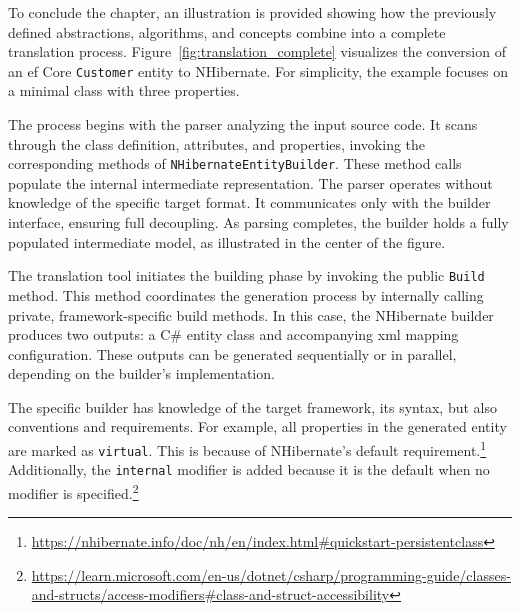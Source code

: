 \begin{example}
\small
To conclude the chapter, an illustration is provided showing how the previously defined abstractions, algorithms, and concepts combine into a complete translation process. Figure~\ref{fig:translation_complete} visualizes the conversion of an \acrshort{ef} Core \texttt{Customer} entity to NHibernate. For simplicity, the example focuses on a minimal class with three properties.

The process begins with the parser analyzing the input source code. It scans through the class definition, attributes, and properties, invoking the corresponding methods of \texttt{NHibernateEntityBuilder}. These method calls populate the internal intermediate representation. The parser operates without knowledge of the specific target format. It communicates only with the builder interface, ensuring full decoupling. As parsing completes, the builder holds a fully populated intermediate model, as illustrated in the center of the figure. 

The translation tool initiates the building phase by invoking the public \texttt{Build} method. This method coordinates the generation process by internally calling private, framework-specific build methods. In this case, the NHibernate builder produces two outputs: a C\# entity class and accompanying \acrshort{xml} mapping configuration. These outputs can be generated sequentially or in parallel, depending on the builder's implementation.

The specific builder has knowledge of the target framework, its syntax, but also conventions and requirements. For example, all properties in the generated entity are marked as \texttt{virtual}. This is because of NHibernate's default requirement.\footnote{\url{https://nhibernate.info/doc/nh/en/index.html\#quickstart-persistentclass}} Additionally, the \texttt{internal} modifier is added because it is the default when no modifier is specified.\footnote{\url{https://learn.microsoft.com/en-us/dotnet/csharp/programming-guide/classes-and-structs/access-modifiers\#class-and-struct-accessibility}}


\end{example}
